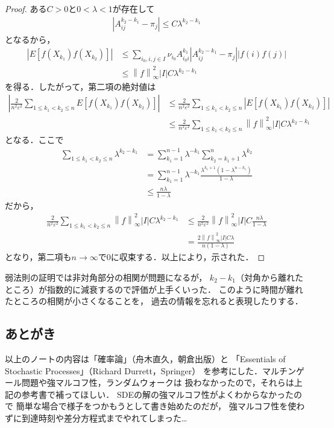 \documentclass[dvipdfmx,autodetect-engine]{jsarticle}
\theoremstyle{remark}
\theoremstyle{definition}
\newcommand{\abs}[1]{\left\lvert#1\right\rvert}%
\newcommand{\norm}[1]{\left\lVert#1\right\rVert}%
\begin{document}
\begin{proof}
    ある$C>0$と$0<\lambda<1$が存在して
    \begin{align}
        \abs{A_{ij}^{k_2 - k_1} - \pi_{j}} \leq C \lambda^{k_2 - k_1}
    \end{align}
    となるから，
    \begin{align}
        \abs{E\left[f(X_{k_1})f(X_{k_2})\right] } 
        &\leq \sum_{i_0,i,j \in I} \nu_{i_0} A_{i_0 i}^{k_1} 
        \abs{A_{ij}^{k_2 - k_1} - \pi_{j}}  \abs{f(i)f(j)} \\
        &\leq \norm{f}_{\infty}^{2} \abs{I} C \lambda^{k_2 - k_1}
    \end{align}
    を得る．したがって，第二項の絶対値は
    \begin{align}
        \abs{\frac{2}{n^{2}\varepsilon^{2}} \sum_{1\leq k_1 < k_2 \leq n} 
        E\left[f(X_{k_1})f(X_{k_2})\right] } 
        &\leq \frac{2}{n^{2}\varepsilon^{2}} \sum_{1\leq k_1 < k_2 \leq n} 
        \abs{E\left[f(X_{k_1})f(X_{k_2})\right]}\\
        &\leq \frac{2}{n^{2}\varepsilon^{2}} \sum_{1\leq k_1 < k_2 \leq n} 
        \norm{f}_{\infty}^{2} \abs{I} C \lambda^{k_2 - k_1}
    \end{align}
    となる．ここで
    \begin{align}
        \sum_{1\leq k_1 < k_2 \leq n} \lambda^{k_2 - k_1} 
        &= \sum_{k_1 = 1}^{n-1} \lambda^{-k_1} \sum_{k_2 = k_1 + 1}^{n} \lambda^{k_2}\\
        &= \sum_{k_1 = 1}^{n-1} \lambda^{-k_1} 
        \frac{\lambda^{k_1 +1}(1-\lambda^{n-k_1})}{1-\lambda}\\
        &\leq \frac{n \lambda}{1-\lambda}
    \end{align}
    だから，
    \begin{align}
        \frac{2}{n^{2}\varepsilon^{2}} \sum_{1\leq k_1 < k_2 \leq n} 
        \norm{f}_{\infty}^{2} \abs{I} C \lambda^{k_2 - k_1} 
        &\leq \frac{2}{n^{2}\varepsilon^{2}} 
        \norm{f}_{\infty}^{2} \abs{I} C \frac{n \lambda}{1-\lambda}\\
        &= \frac{2\norm{f}_{\infty}^{2} \abs{I} C\lambda}{n(1-\lambda)}
    \end{align}
    となり，第二項も$n \to\infty$で$0$に収束する．以上により，示された．
\end{proof}


弱法則の証明では非対角部分の相関が問題になるが，
$k_2 - k_1$（対角から離れたところ）が指数的に減衰するので評価が上手くいった．
このように時間が離れたところの相関が小さくなることを，
過去の情報を忘れると表現したりする．


\subsection{あとがき}
以上のノートの内容は「確率論」（舟木直久，朝倉出版）と
「Essentials of Stochastic Processes」（Richard Durrett，Springer）
を参考にした．マルチンゲール問題や強マルコフ性，ランダムウォークは
扱わなかったので，それらは上記の参考書で補ってほしい．
SDEの解の強マルコフ性がよくわからなかったので
簡単な場合で様子をつかもうとして書き始めたのだが，
強マルコフ性を使わずに到達時刻や差分方程式までやれてしまった…
\end{document}
